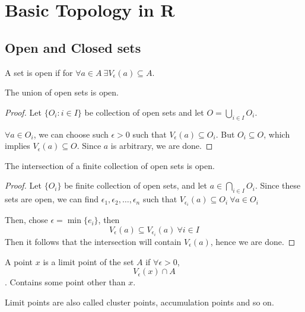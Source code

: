 \chapter{Basic Topology in R}
\section{Open and Closed sets}

\begin{definition} A set is open if for $\forall a \in A \ \exists V_{\epsilon}(a) \subseteq A$.
\end{definition}

\begin{theorem} The union of open sets is open.
    \begin{proof} Let $\{ O_i: i \in I\}$ be collection of open sets and let $O = \bigcup_{i \in I} O_i$.

        $\forall a \in O_i$, we can choose such $\epsilon > 0 $ such that $V_{\epsilon}(a) \subseteq O_i$. But $O_i \subseteq O$, which implies $V_{\epsilon}(a) \subseteq O$. Since $a$ is arbitrary, we are done.
    \end{proof}
\end{theorem}
\begin{theorem} The intersection of a finite collection of open sets is open.
    \begin{proof}
        Let $\{O_i\}$ be finite collection of open sets, and let $a \in \bigcap_{i \in I} O_i$. Since these sets are open, we can find $\epsilon_1, \epsilon_2, \ldots, \epsilon_n$ such that $V_{\epsilon_i}(a) \subseteq O_i \ \forall a \in O_i$

        Then, chose $\epsilon = \min \{ e_i\}$, then
        \[ V_{\epsilon}(a) \subseteq V_{\epsilon_i}(a) \ \forall i \in I\]
        Then it follows that the intersection will contain $V_{\epsilon}(a)$, hence we are done.
    \end{proof}
\end{theorem}
\begin{definition} A point $x$ is a limit point of the set $A$ if $\forall \epsilon > 0$,
    \[ V_{\epsilon}(x) \cap A \].
    Contains some point other than $x$.

    Limit points are also called cluster points, accumulation points and so on.
\end{definition}
